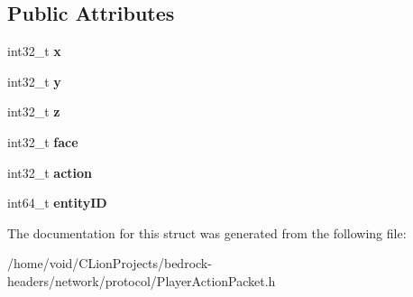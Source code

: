 \subsection*{Public Attributes}
\begin{DoxyCompactItemize}
\item 
\mbox{\label{struct_player_action_packet_a37a1af5aa6d9882ea91078f0c0892ce5}} 
int32\+\_\+t {\bfseries x}
\item 
\mbox{\label{struct_player_action_packet_abc5eb260d9b4f13e5ade4d5cd2b79b73}} 
int32\+\_\+t {\bfseries y}
\item 
\mbox{\label{struct_player_action_packet_ac875598e2dc3f0393ec7d137e49175d1}} 
int32\+\_\+t {\bfseries z}
\item 
\mbox{\label{struct_player_action_packet_a4d96f9c8ccb8f69eab9f54515d35ca34}} 
int32\+\_\+t {\bfseries face}
\item 
\mbox{\label{struct_player_action_packet_afa154071910179f869ec2537be3a8629}} 
int32\+\_\+t {\bfseries action}
\item 
\mbox{\label{struct_player_action_packet_a99d9888bbd07702fb801512dd4bbe087}} 
int64\+\_\+t {\bfseries entity\+ID}
\end{DoxyCompactItemize}


The documentation for this struct was generated from the following file\+:\begin{DoxyCompactItemize}
\item 
/home/void/\+C\+Lion\+Projects/bedrock-\/headers/network/protocol/Player\+Action\+Packet.\+h\end{DoxyCompactItemize}

